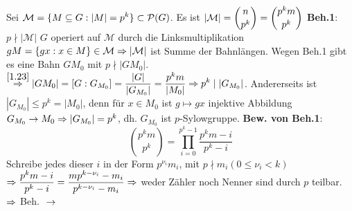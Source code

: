 \documentclass[a4paper,10pt,german]{scrbook}
\theoremstyle{saetze}
\theoremstyle{definitionen}
\begin{document}
    {
        \item Sei $\displaystyle\mathcal{M} = \{ M \subseteq G: |M| = p^k\} \subset 
        \mathcal{P}(G)$. \newline Es ist $\displaystyle|\mathcal{M}| = \binom{n}{p^k} = \binom{p^k
        m}{p^k}$ \newline
        \textbf{Beh.1}:
            $p \nmid |\mathcal{M}|$ \newline
        $G$ operiert auf $\mathcal{M}$ durch die Linksmultiplikation $gM = 
        \{ gx : x \in M\} \in \mathcal{M} \Rightarrow |\mathcal{M}|$ ist 
        Summe der Bahnlängen. Wegen Beh.1 gibt es eine Bahn $G M_0$ mit $p \nmid
        |G M_0|$. \newline $\displaystyle \overset{\ref{1.23}}{\Rightarrow} |G M_0|
        =[G:G_{M_0}] = \frac{|G|}{|G_{M_0}|} = \frac{p^km}{|M_0|} \Rightarrow p^k \mid |G_{M_0}|$.\newline
        Andererseits ist $|G_{M_0}| \leq p^k = |M_0|$, denn für $x \in M_0$ ist
        $g\mapsto gx$ injektive Abbildung $G_{M_0} \rightarrow M_0 \Rightarrow |G_{M_0}| = p^k$,
        dh. $G_{M_0}$ ist $p$-Sylowgruppe. \newline
        \textbf{Bew. von Beh.1}:
            \[ \binom{p^k m}{p^k} = \prod_{i=0}^{p^k-1} \frac{p^k m - i}{p^k
            -i}\] Schreibe jedes dieser $i$ in der Form $p^{\nu_i} m_i$, mit $p
            \nmid m_i (0\leq \nu_i < k)$ $\displaystyle \Rightarrow \frac{p^k m - i}{p^k
            - i} = \frac{m p^{k-\nu_i} - m_i}{p^{k-\nu_i} - m_i} \Rightarrow$ weder
            Zähler noch Nenner sind durch $p$ teilbar. $\Rightarrow$ Beh. $\\\rightarrow$

}
\end{document}

